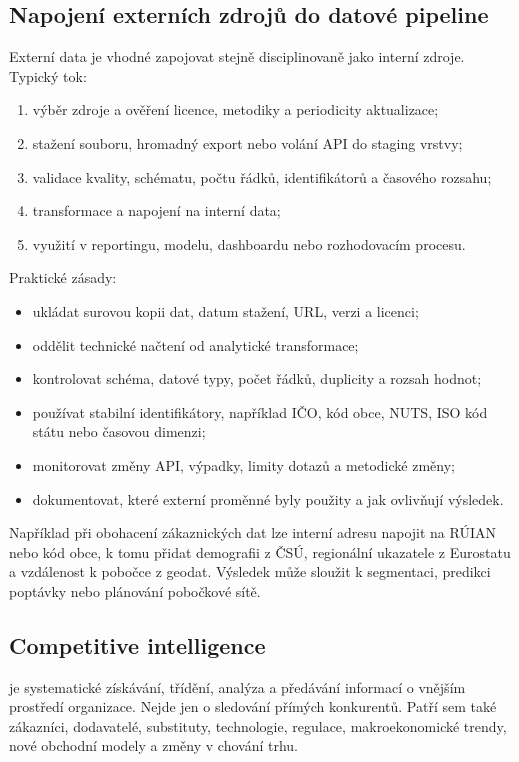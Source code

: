 \subsection{Napojení externích zdrojů do datové pipeline}
Externí data je vhodné zapojovat stejně disciplinovaně jako interní zdroje. Typický tok:
\begin{enumerate}
  \item výběr zdroje a ověření licence, metodiky a periodicity aktualizace;
  \item stažení souboru, hromadný export nebo volání API do staging vrstvy;
  \item validace kvality, schématu, počtu řádků, identifikátorů a časového rozsahu;
  \item transformace a napojení na interní data;
  \item využití v reportingu, modelu, dashboardu nebo rozhodovacím procesu.
\end{enumerate}

Praktické zásady:
\begin{itemize}
  \item ukládat surovou kopii dat, datum stažení, URL, verzi a licenci;
  \item oddělit technické načtení od analytické transformace;
  \item kontrolovat schéma, datové typy, počet řádků, duplicity a rozsah hodnot;
  \item používat stabilní identifikátory, například IČO, kód obce, NUTS, ISO kód státu nebo časovou
  dimenzi;
  \item monitorovat změny API, výpadky, limity dotazů a metodické změny;
  \item dokumentovat, které externí proměnné byly použity a jak ovlivňují výsledek.
\end{itemize}

Například při obohacení zákaznických dat lze interní adresu napojit na RÚIAN nebo kód obce, k tomu
přidat demografii z ČSÚ, regionální ukazatele z Eurostatu a vzdálenost k pobočce z geodat. Výsledek
může sloužit k segmentaci, predikci poptávky nebo plánování pobočkové sítě.

\subsection{Competitive intelligence}
 je systematické získávání, třídění, analýza a předávání informací
o vnějším prostředí organizace. Nejde jen o sledování přímých konkurentů. Patří sem také zákazníci,
dodavatelé, substituty, technologie, regulace, makroekonomické trendy, nové obchodní modely a změny
v chování trhu.

